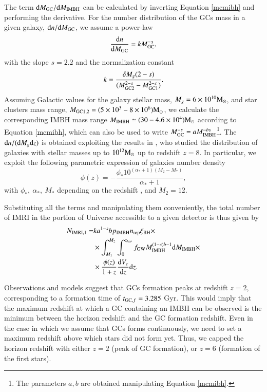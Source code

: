 \documentclass[article]{aa}
\newcommand{\derd}{{\rm d}}
\newcommand{\Ms}{{\rm M}_\odot}
\newcommand{\gw}{{\rm GW}}
\newcommand{\gc}{{\rm GC}}
\newcommand{\ibh}{{\rm IMBH}}
\newcommand{\imri}{{\rm IMRI}}
\newcommand{\bh}{{\rm BH}}
\begin{document}
The term $\derd M_\gc / \derd M_\ibh$ can be calculated by inverting Equation \ref{mcmibh} and performing the derivative. For the number distribution of the GCs mass in a given galaxy, $\derd n/\derd M_\gc$, we assume a power-law
\begin{equation}
\frac{\derd n}{\derd M_\gc} = k M_\gc^{-s},
\end{equation}
with the slope $s = 2.2$ and the normalization constant 
\begin{equation*}
k = \frac{\delta M_g (2-s)}{(M_{\gc 2}^{2-s} - M_{\gc 1}^{2-s})}.
\end{equation*}
Assuming Galactic values for the galaxy stellar mass, $M_g = 6\times 10^{10}\Ms$, and star clusters mass range, $M_{\gc 1,2} = (5\times 10^3 - 8\times 10^6) \Ms$, we calculate the corresponding IMBH mass range $M_\ibh \simeq (30 - 4.6\times 10^4)\Ms$ according to Equation \ref{mcmibh}, which can also be used to write $M_\gc^{-s} = aM_\ibh^{-bs}$\footnote{The parameters $a,b$ are obtained manipulating Equation \ref{mcmibh}.}. The $\derd n/(\derd M_g\derd z)$ is obtained exploiting the results in \cite{conselice16}, who studied the distribution of galaxies with stellar masses up to $10^{12}\Ms$ up to redshift $z=8$. In particular, we exploit the following parametric expression of galaxies number density 
\begin{equation}
\phi(z) = -\frac{\phi_* 10^{(\alpha_* + 1)(M_2-M_*)}}{\alpha_* + 1},
\end{equation}
with $\phi_*,~\alpha_*,~M_*$ depending on the redshift \citep[see Table 1 in][]{conselice16}, and $M_2 = 12$. 

Substituting all the terms and manipulating them conveniently, the total number of IMRI in the portion of Universe accessible to a given detector is thus given by
\begin{align}
N_{\imri,1} = & k a^{1-s} b p_\ibh n_{\rm rep} \xi_\bh \times \nonumber \\
& \times \int_{M_{1}}^{M_{2}} \int_0^{z_{hor}} f_{\gw} M_\ibh^{(1-s)b-1}  \derd M_\ibh \times \nonumber \\
& \times   \frac{\phi(z)}{1+z} \frac{\derd V_c}{\derd z}\derd z .
\label{eq:nimri1}
\end{align}

Observations and models suggest that GCs formation peaks at redshift $z=2$, corresponding to a formation time of $t_{\gc ,f} = 3.285$ Gyr. This would imply that the maximum redshift at which a GC containing an IMBH can be observed is the minimum between the horizon redshift and the GC formation redshift. Even in the case in which we assume that GCs forms continuously, we need to set a maximum redshift above which stars did not form yet. Thus, we capped the horizon redshift with either $z=2$ (peak of GC formation), or $z=6$ (formation of the first stars).
\end{document}
